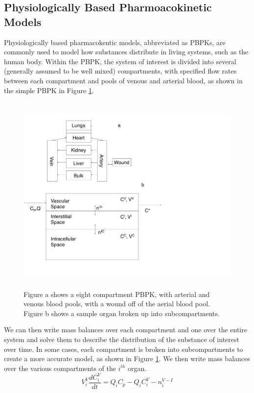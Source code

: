 \documentclass[12pt]{article}
\begin{document}
\subsection*{Physiologically Based Pharmoacokinetic Models}
Physiologically based pharmacokentic models, abbreviated as PBPKs, are commonly used to model how substances distribute in living systems, such as the human body. Within the PBPK, the system of interest is divided into several (generally assumed to be well mixed) compartments, with specified flow rates between each compartment and pools of venous and arterial blood, as shown in the simple PBPK in Figure \ref{fig:SamplePBPK}. 
\begin{figure}
        \vspace{-20pt}
        \centering
        \includegraphics[height=10cm]{figures/bothbodyfigures}
         \vspace{-20pt}
        \caption{\scriptsize Figure a shows a eight compartment PBPK, with arterial and venous blood pools, with a wound off of the aerial blood pool. Figure b shows a sample organ broken up into subcompartments.}
                 \label{fig:SamplePBPK}
\end{figure}    
We can then write mass balances over each compartment and one over the entire system and solve them to describe the distribution of the substance of interest over time. 
In some cases, each compartment is broken into subcompartments to create a more accurate model, as shown in Figure \ref{fig:SamplePBPK}.
We then write mass balances over the various compartments of the $i^{th}$ organ. 
\begin{equation}
V^V_i\frac{dC^V_i}{dt} = Q_iC_p-Q_iC_i^V-n_i^{V-I}
\end{equation}
\end{document}
